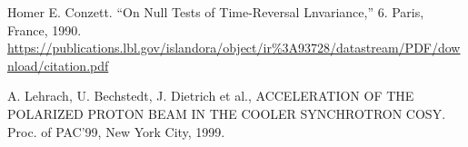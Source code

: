 \documentclass[14pt]{extarticle}
\newcommand{\SrcNm}[1]{\textsc{#1}}
\begin{document}
\begin{thebibliography}{9}
Homer E. Conzett. “On Null Tests of Time-Reversal Lnvariance,” 6. Paris, France, 1990. \url{https://publications.lbl.gov/islandora/object/ir%3A93728/datastream/PDF/download/citation.pdf}


A. Lehrach, U. Bechstedt, J. Dietrich et al.,
\SrcNm{ACCELERATION OF THE POLARIZED PROTON BEAM IN THE
COOLER SYNCHROTRON COSY}.
Proc. of PAC'99, New York City, 
1999.

%
%
%
%
%
%
%
%

\end{thebibliography}
\end{document}
